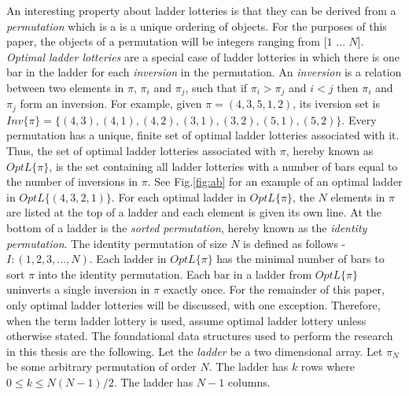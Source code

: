 An interesting property about ladder lotteries is that they can be derived from a 
\emph{permutation} which is a is a unique ordering of objects\cite{A1}.
For the purposes of this paper, the objects of a permutation will be integers 
ranging from [$1$ $\dots$ $N$]. \emph{Optimal ladder lotteries} are a special case of ladder 
lotteries in which there is one bar in the ladder for each \emph{inversion} in the permutation\cite{A1}.
An \emph{inversion} is a relation between two elements in $\pi$, 
$\pi_{i}$ and $\pi_{j}$, such that if $\pi_{i}>\pi_{j}$ and $i<j$ then $\pi_{i}$ and $\pi_{j}$ 
form an inversion. 
For example, given $\pi=(4,3,5,1,2)$, its iversion set is $Inv\{\pi\} =\{(4,3),(4,1),(4,2),(3,1),(3,2),(5,1),(5,2)\}$.
Every permutation has a unique, finite set of optimal ladder lotteries associated with it. 
 Thus, the set of optimal ladder lotteries associated with $\pi$, 
 hereby known as \emph{$OptL\{\pi\}$}, is the set containing all ladder lotteries 
 with a number of bars equal to the number of inversions in $\pi$. 
 See Fig.\ref{fig:ab} for an example of an optimal ladder in $OptL\{(4,3,2,1)\}$.
 For each optimal ladder in $OptL\{\pi\}$, the $N$ 
 elements in $\pi$ are listed at the top of a ladder and each 
 element is given its own line. 
 At the bottom of a ladder is the \emph{sorted permutation}, 
 hereby known as the \emph{identity permutation}\cite{A1}. 
 The  identity permutation of size $N$ is defined as follows - $I:(1, 2, 3, \dots, N)$. 
 Each ladder in $OptL\{\pi\}$ has the minimal number of bars to sort $\pi$ 
 into the identity permutation. Each bar in a ladder from $OptL\{\pi\}$ uninverts a single 
 inversion in $\pi$ exactly once. For the remainder of this paper, only optimal ladder 
 lotteries will be discussed, with one exception. Therefore, when the term ladder lottery is used, assume 
 optimal ladder lottery unless otherwise stated. The foundational data structures used to perform the research in this thesis are the following. 
 Let the \emph{ladder} be a two dimensional 
array. Let $\pi_{N}$ be some arbitrary permutation of order $N$. The ladder has $k$ rows where $0 \leq k \leq N(N-1)/2$. 
The ladder has $N-1$ columns.  
